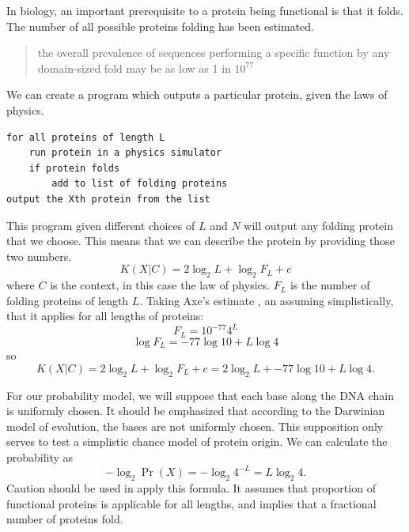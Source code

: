 In biology, an important prerequisite to a protein being functional is that it folds.
The number of all possible proteins folding has been estimated.
\begin{quotation}
    the overall prevalence of sequences performing a specific function by any domain-sized fold may be as low as 1 in $10^{77}$ \citep{axe2004}
\end{quotation}
We can create a program which outputs a particular protein, given the laws of physics.
\begin{verbatim}
for all proteins of length L
    run protein in a physics simulator
    if protein folds
        add to list of folding proteins
output the Xth protein from the list
\end{verbatim}

This program given different choices of $L$ and $N$ will output any folding protein that we choose.
This means that we can describe the protein by providing those two numbers.
\begin{equation}
    K(X|C) = 2 \log_2 L + \log_2 F_L + c
\end{equation} where $C$ is the context, in this case the law of physics.
$F_L$ is the number of folding proteins of length $L$.
Taking Axe's estimate \citep{axe2004}, an assuming simplistically, that it applies for all lengths of proteins:
\begin{equation}
    F_L = 10^{-77} 4^L 
\end{equation}
\begin{equation}
    \log F_L = -77 \log 10 + L \log 4
\end{equation}
so
\begin{equation}
    K(X|C) = 2 \log_2 L + \log_2 F_L + c = 2 \log_2 L + -77 \log 10  + L \log 4 \mbox{.}
\end{equation}

For our probability model, we will suppose that each base along the DNA chain is uniformly chosen.
It should be emphasized that according to the Darwinian model of evolution, the bases are not uniformly chosen.
This supposition only serves to test a simplistic chance model of protein origin.
We can calculate the probability as
\begin{equation}
    -\log_2 \Pr(X) =  -\log_2 4^{-L} = L \log_2 4 \mbox{.}
\end{equation}
Caution should be used in apply this formula.
It assumes that proportion of functional proteins is applicable for all lengths, and implies that a fractional number of proteins fold.

